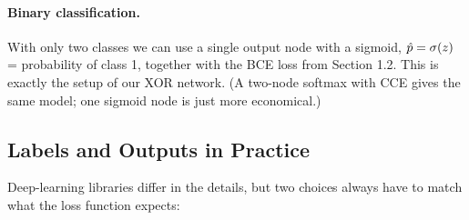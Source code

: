 \documentclass[12pt, a4paper]{article}
\begin{document}
\paragraph{Binary classification.}
With only two classes we can use a single output node with a sigmoid,
$\hat{p} = \sigma(z)$ = probability of class 1, together with the BCE
loss from Section 1.2. This is exactly the setup of our XOR network. (A
two-node softmax with CCE gives the same model; one sigmoid node is just more
economical.)

\subsection{Labels and Outputs in Practice}

Deep-learning libraries differ in the details, but two choices always have to
match what the loss function expects:
\end{document}
